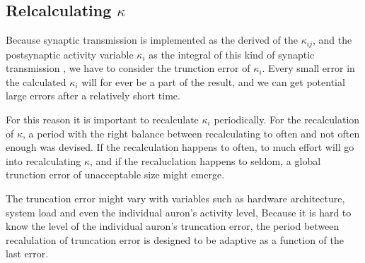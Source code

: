 

		\subsection{Relcalculating $\kappa$}
		\label{ssecRecalcKappa}
		Because synaptic transmission is implemented as the derived of the $\kappa_{ij}$, and the postsynaptic activity variable $\kappa_i$ as the integral of this kind of synaptic transmission
		, we have to consider the trunction error of $\kappa_i$. 
		Every small error in the calculated $\kappa_i$ will for ever be a part of the result, and we can get potential large errors after a relatively short time.

		For this reason it is important to recalculate $\kappa_i$ periodically.
		For the recalculation of $\kappa$, a period with the right balance between recalculating to often and not often enough was devised.
		If the recalculation happens to often, to much effort will go into recalculating $\kappa$, and if the recaluclation happens to seldom, a global trunction error of unacceptable size might emerge.

		The truncation error might vary with variables such as hardware architecture, system load and even the individual auron's activity level,
		Because it is hard to know the level of the individual auron's truncation error, the period between recalulation of truncation error is designed to be adaptive as a function of the last error.

